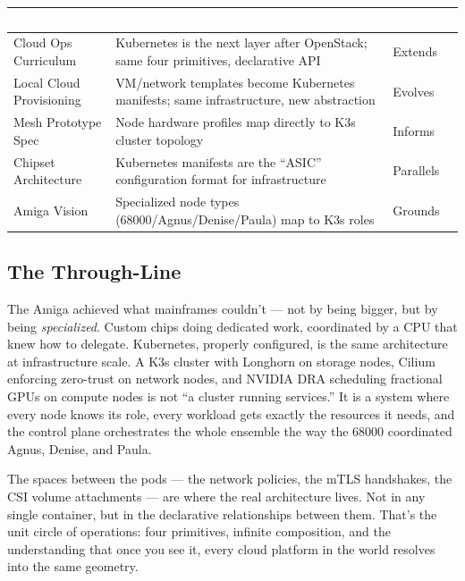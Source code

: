 \documentclass[11pt,letterpaper]{article}
\newcommand{\tableheader}[1]{\textbf{\sffamily\textcolor{white}{#1}}}
\begin{document}
\begin{center}
\begin{tabularx}{\textwidth}{L{4.5cm}XC{2.5cm}}
\toprule
{}
\tableheader{Document} & \tableheader{Relationship} & \tableheader{Direction} \\
\midrule
Cloud Ops Curriculum & Kubernetes is the next layer after OpenStack; same four primitives, declarative API & Extends \\
Local Cloud Provisioning & VM/network templates become Kubernetes manifests; same infrastructure, new abstraction & Evolves \\
Mesh Prototype Spec & Node hardware profiles map directly to K3s cluster topology & Informs \\
Chipset Architecture & Kubernetes manifests are the ``ASIC'' configuration format for infrastructure & Parallels \\
Amiga Vision & Specialized node types (68000/Agnus/Denise/Paula) map to K3s roles & Grounds \\
\bottomrule
\end{tabularx}
\end{center}

\subsection{The Through-Line}

The Amiga achieved what mainframes couldn't --- not by being bigger, but by being \textit{specialized}. Custom chips doing dedicated work, coordinated by a CPU that knew how to delegate. Kubernetes, properly configured, is the same architecture at infrastructure scale. A K3s cluster with Longhorn on storage nodes, Cilium enforcing zero-trust on network nodes, and NVIDIA DRA scheduling fractional GPUs on compute nodes is not ``a cluster running services.'' It is a system where every node knows its role, every workload gets exactly the resources it needs, and the control plane orchestrates the whole ensemble the way the 68000 coordinated Agnus, Denise, and Paula.

The spaces between the pods --- the network policies, the mTLS handshakes, the CSI volume attachments --- are where the real architecture lives. Not in any single container, but in the declarative relationships between them. That's the unit circle of operations: four primitives, infinite composition, and the understanding that once you see it, every cloud platform in the world resolves into the same geometry.
\end{document}
